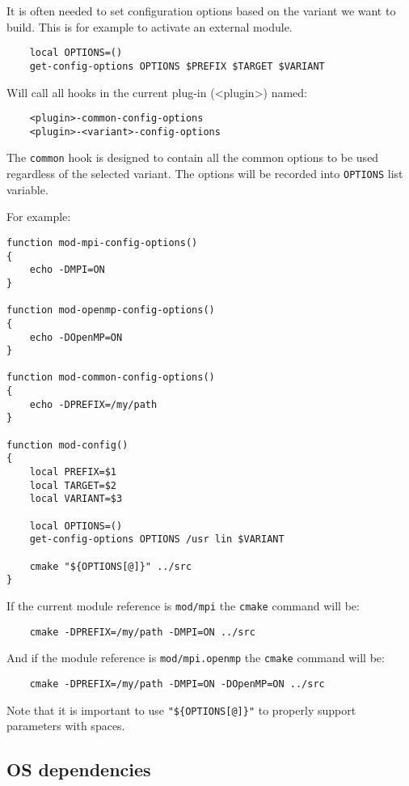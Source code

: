 \documentclass[a4paper,12pt,twoside]{article}
\newcommand{\code}[1]{\texttt{#1}}
\begin{document}
It is often needed to set configuration options based on the variant we want to build. This is for example to activate an external module.

\begin{lstlisting}
	local OPTIONS=()
	get-config-options OPTIONS $PREFIX $TARGET $VARIANT
\end{lstlisting}

Will call all hooks in the current plug-in (<plugin>) named:

\begin{lstlisting}
	<plugin>-common-config-options
	<plugin>-<variant>-config-options
\end{lstlisting}

The \code{common} hook is designed to contain all the common options to be used regardless of the selected variant. The options will be recorded into \code{OPTIONS} list variable.

For example:

\begin{lstlisting}
function mod-mpi-config-options()
{
	echo -DMPI=ON
}

function mod-openmp-config-options()
{
	echo -DOpenMP=ON
}

function mod-common-config-options()
{
	echo -DPREFIX=/my/path
}

function mod-config()
{
	local PREFIX=$1
	local TARGET=$2
	local VARIANT=$3

	local OPTIONS=()
	get-config-options OPTIONS /usr lin $VARIANT

	cmake "${OPTIONS[@]}" ../src
}
\end{lstlisting}

If the current module reference is \code{mod/mpi} the \code{cmake} command will be:

\begin{lstlisting}
	cmake -DPREFIX=/my/path -DMPI=ON ../src
\end{lstlisting}

And if the module reference is \code{mod/mpi.openmp} the \code{cmake} command will be:

\begin{lstlisting}
	cmake -DPREFIX=/my/path -DMPI=ON -DOpenMP=ON ../src
\end{lstlisting}

Note that it is important to use \code{"\$\{OPTIONS[@]\}"} to properly support parameters with spaces.

\subsection{OS dependencies}
\label{OS dependencies}
\end{document}
